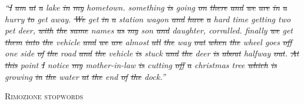 \begin{minipage}[t]{\textwidth}
\begin{minipage}[t]{0.75\textwidth}
    \begin{spacing}{0.5}
    {\scriptsize \it
    ``\sout{I} \sout{am} \sout{at} \sout{a} {\color{orangeUnicam}lake} \sout{in} \sout{my} {\color{orangeUnicam}\color{orangeUnicam} hometown}.
    {\color{orangeUnicam}something} \sout{is} {\color{orangeUnicam}going} \sout{on} \sout{there} \sout{and} \sout{we} \sout{are} \sout{in}
    \sout{a} {\color{orangeUnicam}hurry} \sout{to} {\color{orangeUnicam}get} {\color{orangeUnicam}away}.
    \sout{We} {\color{orangeUnicam}get} \sout{in} \sout{a} {\color{orangeUnicam}station} {\color{orangeUnicam}wagon} \sout{and} \sout{have} \sout{a}
    {\color{orangeUnicam}hard} {\color{orangeUnicam}time} {\color{orangeUnicam}getting} {\color{orangeUnicam}two} {\color{orangeUnicam}pet} {\color{orangeUnicam}deer}, \sout{with} \sout{the}
    \sout{same} {\color{orangeUnicam}names} \sout{as} \sout{my} {\color{orangeUnicam}son} \sout{and} {\color{orangeUnicam}daughter}, {\color{orangeUnicam}corralled}.
    {\color{orangeUnicam}finally} \sout{we} {\color{orangeUnicam}get} \sout{them} \sout{into} \sout{the} {\color{orangeUnicam}vehicle} \sout{and} \sout{we}
    \sout{are} {\color{orangeUnicam}almost} \sout{all} \sout{the} {\color{orangeUnicam}way} \sout{out} \sout{when} \sout{the} {\color{orangeUnicam}wheel}
    {\color{orangeUnicam}goes} \sout{off} {\color{orangeUnicam}one} {\color{orangeUnicam}side} \sout{of} \sout{the} {\color{orangeUnicam}road}
    \sout{and} \sout{the} {\color{orangeUnicam}vehicle} \sout{is} {\color{orangeUnicam}stuck} \sout{and} \sout{the} {\color{orangeUnicam}deer} \sout{is}
    \sout{about} {\color{orangeUnicam}halfway} \sout{out}.
    \sout{At} \sout{this} {\color{orangeUnicam}point} \sout{I} {\color{orangeUnicam}notice} \sout{my} {\color{orangeUnicam}mother-in-law} \sout{is}
    {\color{orangeUnicam}cutting} \sout{off} \sout{a} {\color{orangeUnicam}christmas} {\color{orangeUnicam}tree} \sout{which} \sout{is} {\color{orangeUnicam}growing}
    \sout{in} \sout{the} {\color{orangeUnicam}water} \sout{at} \sout{the} {\color{orangeUnicam}end} \sout{of} \sout{the} {\color{orangeUnicam}dock}.''}
    \end{spacing}
\end{minipage}
\hfill
    \begin{minipage}[t]{0.23\textwidth}
        \centering
        {\color{orangeUnicam} \scshape \small Rimozione stopwords}
    \end{minipage}
\end{minipage}